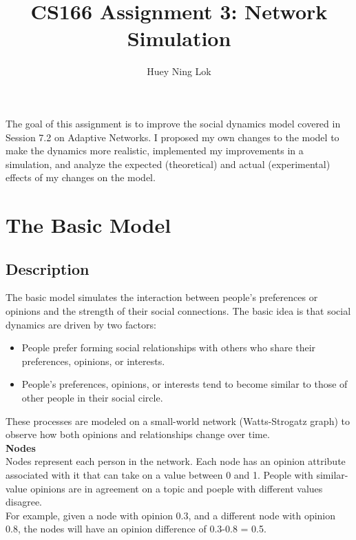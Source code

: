 \documentclass[11pt]{article}
\title{CS166 Assignment 3: Network Simulation}
\author{Huey Ning Lok}
\begin{document}
    
    
    \maketitle
    


The goal of this assignment is to improve the social dynamics model
covered in Session 7.2 on Adaptive Networks. I proposed my own changes
to the model to make the dynamics more realistic, implemented my
improvements in a simulation, and analyze the expected (theoretical) and
actual (experimental) effects of my changes on the model.

    \section{The Basic Model}

\subsection{Description}

The basic model simulates the interaction between people's preferences
or opinions and the strength of their social connections. The basic idea
is that social dynamics are driven by two factors:

\begin{itemize}
\item
  People prefer forming social relationships with others who share their
  preferences, opinions, or interests.
\item
  People's preferences, opinions, or interests tend to become similar to
  those of other people in their social circle.
\end{itemize}

These processes are modeled on a small-world network (Watts-Strogatz
graph) to observe how both opinions and relationships change over time.
\\
\textbf{Nodes}\\

Nodes represent each person in the network. Each node has an opinion
attribute associated with it that can take on a value between 0 and 1.
People with similar-value opinions are in agreement on a topic and
poeple with different values disagree.\\

For example, given a node with opinion 0.3, and a different node with
opinion 0.8, the nodes will have an opinion difference of
\textbar{}0.3-0.8\textbar{} = 0.5.\\
\end{document}
